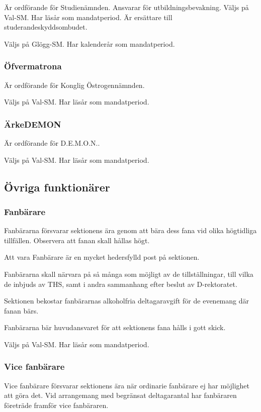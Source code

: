\documentclass{dgovdoc}
\begin{document}
Är ordförande för Studienämnden. Ansvarar för utbildningsbevakning. Väljs på
Val-SM. Har läsår som mandatperiod. Är ersättare till studerandeskyddsombudet.

Väljs på Glögg-SM. Har kalenderår som mandatperiod.

\subsubsection{Öfvermatrona}

Är ordförande för Konglig Östrogennämnden.

Väljs på Val-SM. Har läsår som mandatperiod.

\subsubsection{ÄrkeDEMON}

Är ordförande för D.E.M.O.N..

Väljs på Val-SM. Har läsår som mandatperiod.

\subsection{Övriga funktionärer}

\subsubsection{Fanbärare}

Fanbärarna försvarar sektionens ära genom att bära dess fana vid olika
högtidliga tillfällen. Observera att fanan skall hållas högt.

Att vara Fanbärare är en mycket hedersfylld post på sektionen.

Fanbärarna skall närvara på så många som möjligt av de tillställningar, till
vilka de inbjuds av THS, samt i andra sammanhang efter beslut av D-rektoratet.

Sektionen bekostar fanbärarnas alkoholfria deltagaravgift för de evenemang där
fanan bärs.

Fanbärarna bär huvudansvaret för att sektionens fana hålls i gott skick.

Väljs på Val-SM. Har läsår som mandatperiod.

\subsubsection{Vice fanbärare}

Vice fanbärare försvarar sektionens ära när ordinarie fanbärare ej har
möjlighet att göra det. Vid arrangemang med begränsat deltagarantal har
fanbäraren företräde framför vice fanbäraren.
\end{document}
